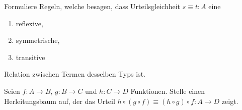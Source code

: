 \documentclass{uebung}
\begin{document}

\begin{exercise}
  Formuliere Regeln, welche besagen, dass Urteilsgleichheit $s\equiv t:A$ eine
  \begin{enumerate}
    \item reflexive,
    \item symmetrische,
    \item transitive
  \end{enumerate}
  Relation zwischen Termen desselben Typs ist.
\end{exercise}

\begin{exercise}
  Seien $f:A\to B$, $g:B\to C$ und $h:C\to D$ Funktionen.
  Stelle einen Herleitungsbaum auf, der das Urteil $h\circ(g\circ f)\equiv (h\circ g)\circ f:A\to D$ zeigt.
\end{exercise}
\end{document}
